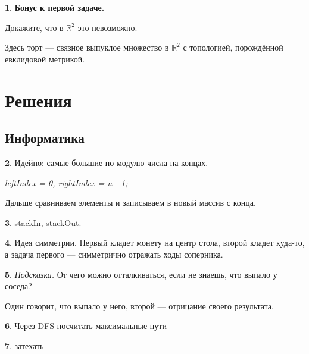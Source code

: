 \documentclass[14pt, a4paper]{extarticle}
\theoremstyle{definition}
\newtheorem{problem}{}
\theoremstyle{definition}
\theoremstyle{remark}
\numberwithin{equation}{section}
\newcommand{\R}{\ensuremath{\mathbb{R}}}
\begin{document}
\begin{problem}
    \textbf{Бонус к первой задаче.}

    Докажите, что в $\R^2$ это невозможно.

    Здесь торт --- связное выпуклое множество в $\R^2$ 
    с топологией, порождённой евклидовой метрикой.
\end{problem}

\newpage
\section*{Решения}
\subsection*{Информатика}
\setcounter{problem}{0}

\begin{problem}
    Идейно: самые большие по модулю числа на концах.

    \textit{leftIndex = 0, rightIndex = n - 1;}

    Дальше сравниваем элементы и записываем в новый массив с конца.
\end{problem}

\begin{problem}
    stackIn, stackOut.
\end{problem}

\begin{problem}
    Идея симметрии. Первый кладет монету на центр стола, второй кладет
    куда-то, а задача первого --- симметрично отражать ходы соперника.
\end{problem}

\begin{problem}
    \textit{Подсказка.} От чего можно отталкиваться, если не знаешь, 
    что выпало у соседа?

    Один говорит, что выпало у него, второй --- отрицание своего результата.
\end{problem}

\begin{problem}
    Через DFS посчитать максимальные пути 
\end{problem}

\begin{problem}
    затехать
\end{problem}
\end{document}
